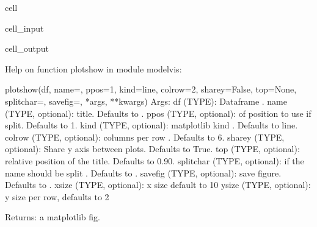 \documentclass[letterpaper,10pt,english]{jupyterBook}
\begin{document}
\begin{sphinxuseclass}{cell}\begin{sphinxVerbatimInput}

\begin{sphinxuseclass}{cell_input}
\begin{sphinxVerbatim}[commandchars=\\\{\}]
   
\end{sphinxVerbatim}

\end{sphinxuseclass}\end{sphinxVerbatimInput}
\begin{sphinxVerbatimOutput}

\begin{sphinxuseclass}{cell_output}
\begin{sphinxVerbatim}[commandchars=\\\{\}]
Help on function plotshow in module modelvis:

plotshow(df, name=\PYGZsq{}\PYGZsq{}, ppos=\PYGZhy{}1, kind=\PYGZsq{}line\PYGZsq{}, colrow=2, sharey=False, top=None, splitchar=\PYGZsq{}\PYGZus{}\PYGZus{}\PYGZsq{}, savefig=\PYGZsq{}\PYGZsq{}, *args, **kwargs)
    Args:
        df (TYPE): Dataframe .
        name (TYPE, optional): title. Defaults to \PYGZsq{}\PYGZsq{}.
        ppos (TYPE, optional): \PYGZsh{} of position to use if split. Defaults to \PYGZhy{}1.
        kind (TYPE, optional): matplotlib kind . Defaults to \PYGZsq{}line\PYGZsq{}.
        colrow (TYPE, optional): columns per row . Defaults to 6.
        sharey (TYPE, optional): Share y axis between plots. Defaults to True.
        top (TYPE, optional): relative position of the title. Defaults to 0.90.
        splitchar (TYPE, optional): if the name should be split . Defaults to \PYGZsq{}\PYGZus{}\PYGZus{}\PYGZsq{}.
        savefig (TYPE, optional): save figure. Defaults to \PYGZsq{}\PYGZsq{}.
        xsize  (TYPE, optional): x size default to 10 
        ysize  (TYPE, optional): y size per row, defaults to 2
    
    Returns:
        a matplotlib fig.
\end{sphinxVerbatim}

\end{sphinxuseclass}\end{sphinxVerbatimOutput}

\end{sphinxuseclass}
\end{document}

